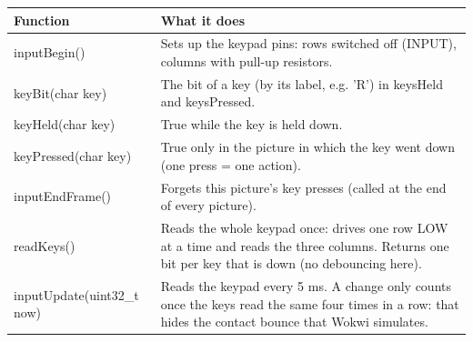 \documentclass[11pt,a4paper]{article}
\begin{document}
\par\noindent\begin{minipage}{\linewidth}\centering\footnotesize
\begin{tabular}{|>{\raggedright\arraybackslash}p{5.82cm}|>{\raggedright\arraybackslash}p{10.68cm}|}
\hline\rowcolor{accent}\textbf{\color{white}Function} & \textbf{\color{white}What it does}\\\hline
inputBegin() & Sets up the keypad pins: rows switched off (INPUT), columns with pull-up resistors.\\\hline
\rowcolor{rowshade}keyBit(char key) & The bit of a key (by its label, e.g. 'R') in keysHeld and keysPressed.\\\hline
keyHeld(char key) & True while the key is held down.\\\hline
\rowcolor{rowshade}keyPressed(char key) & True only in the picture in which the key went down (one press = one action).\\\hline
inputEndFrame() & Forgets this picture's key presses (called at the end of every picture).\\\hline
\rowcolor{rowshade}readKeys() & Reads the whole keypad once: drives one row LOW at a time and reads the three columns. Returns one bit per key that is down (no debouncing here).\\\hline
inputUpdate(uint32\_t now) & Reads the keypad every 5 ms. A change only counts once the keys read the same four times in a row: that hides the contact bounce that Wokwi simulates.\\\hline
\end{tabular}
\end{minipage}\par\medskip
\end{document}
